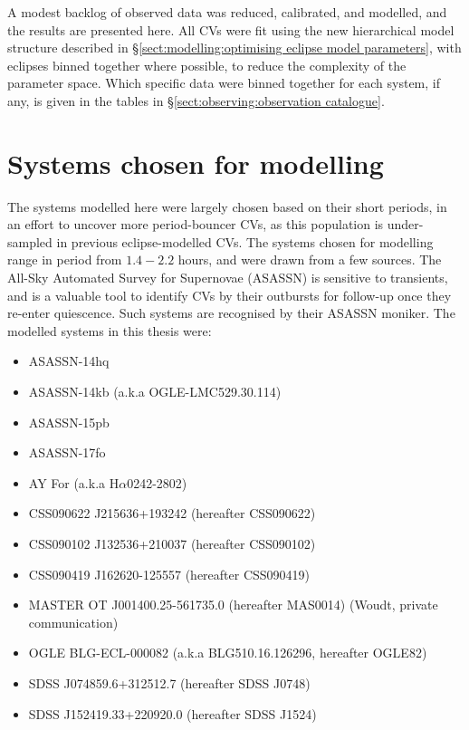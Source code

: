 \label{chpt:results:characterisation of 12 new CVs} %

A modest backlog of observed data was reduced, calibrated, and modelled, and the results are presented here. All CVs were fit using the new hierarchical model structure described in \S\ref{sect:modelling:optimising eclipse model parameters}, with eclipses binned together where possible, to reduce the complexity of the parameter space. Which specific data were binned together for each system, if any, is given in the tables in \S\ref{sect:observing:observation catalogue}.


\section{Systems chosen for modelling}

The systems modelled here were largely chosen based on their short periods, in an effort to uncover more period-bouncer CVs, as this population is under-sampled in previous eclipse-modelled CVs.
The systems chosen for modelling range in period from $1.4 - 2.2$ hours, and were drawn from a few sources.
The All-Sky Automated Survey for Supernovae (ASASSN) \citep{shappee2014} is sensitive to transients, and is a valuable tool to identify CVs by their outbursts for follow-up once they re-enter quiescence. Such systems are recognised by their ASASSN moniker.
The modelled systems in this thesis were:
\begin{itemize}
    \setlength\itemsep{0em}
    \item ASASSN-14hq
    \item ASASSN-14kb (a.k.a OGLE-LMC529.30.114)
    \item ASASSN-15pb
    \item ASASSN-17fo
    \item AY For (a.k.a H$\alpha$0242-2802) \citep{woudt2004}
    \item CSS090622 J215636+193242 (hereafter CSS090622) \citep{kato2012,thorstensen2016}
    \item CSS090102 J132536+210037 (hereafter CSS090102) \citep{kato2012}
    \item CSS090419 J162620-125557 (hereafter CSS090419) \citep{kato2012}
    \item MASTER OT J001400.25-561735.0 (hereafter MAS0014) (Woudt, private communication)
    \item OGLE BLG-ECL-000082 (a.k.a BLG510.16.126296, hereafter OGLE82)
    \item SDSS J074859.6+312512.7 (hereafter SDSS J0748) \citep{kato2016}
    \item SDSS J152419.33+220920.0 (hereafter SDSS J1524) \citep{southworth2010,michel2013}
\end{itemize}


